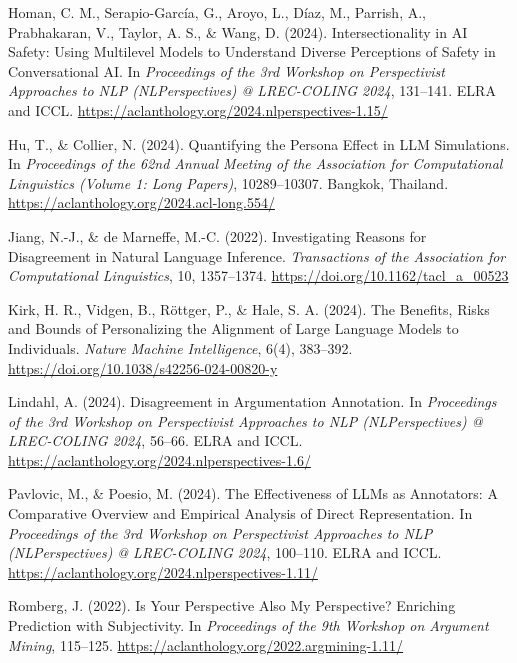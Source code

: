 \documentclass[11pt,a4paper]{article}
\begin{document}
\begin{description}[leftmargin=1.6em,style=unboxed,itemsep=0.3em]
\item Homan, C. M., Serapio-Garc\'{i}a, G., Aroyo, L., D\'{i}az, M., Parrish, A., Prabhakaran, V.,
Taylor, A. S., \& Wang, D. (2024). Intersectionality in AI Safety: Using Multilevel Models to
Understand Diverse Perceptions of Safety in Conversational AI. In \emph{Proceedings of the 3rd
Workshop on Perspectivist Approaches to NLP (NLPerspectives) @ LREC-COLING 2024}, 131--141. ELRA
and ICCL. \url{https://aclanthology.org/2024.nlperspectives-1.15/}

\item Hu, T., \& Collier, N. (2024). Quantifying the Persona Effect in LLM Simulations. In
\emph{Proceedings of the 62nd Annual Meeting of the Association for Computational Linguistics
(Volume 1: Long Papers)}, 10289--10307. Bangkok, Thailand.
\url{https://aclanthology.org/2024.acl-long.554/}

\item Jiang, N.-J., \& de Marneffe, M.-C. (2022). Investigating Reasons for Disagreement in
Natural Language Inference. \emph{Transactions of the Association for Computational Linguistics},
10, 1357--1374. \url{https://doi.org/10.1162/tacl_a_00523}

\item Kirk, H. R., Vidgen, B., R\"{o}ttger, P., \& Hale, S. A. (2024). The Benefits, Risks and
Bounds of Personalizing the Alignment of Large Language Models to Individuals. \emph{Nature
Machine Intelligence}, 6(4), 383--392. \url{https://doi.org/10.1038/s42256-024-00820-y}

\item Lindahl, A. (2024). Disagreement in Argumentation Annotation. In \emph{Proceedings of the
3rd Workshop on Perspectivist Approaches to NLP (NLPerspectives) @ LREC-COLING 2024}, 56--66.
ELRA and ICCL. \url{https://aclanthology.org/2024.nlperspectives-1.6/}

\item Pavlovic, M., \& Poesio, M. (2024). The Effectiveness of LLMs as Annotators: A Comparative
Overview and Empirical Analysis of Direct Representation. In \emph{Proceedings of the 3rd Workshop
on Perspectivist Approaches to NLP (NLPerspectives) @ LREC-COLING 2024}, 100--110. ELRA and ICCL.
\url{https://aclanthology.org/2024.nlperspectives-1.11/}

\item Romberg, J. (2022). Is Your Perspective Also My Perspective? Enriching Prediction with
Subjectivity. In \emph{Proceedings of the 9th Workshop on Argument Mining}, 115--125.
\url{https://aclanthology.org/2022.argmining-1.11/}


\end{description}
\end{document}
